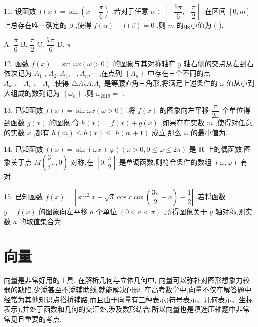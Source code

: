 11. 设函数 $f\left( x\right)  = \sin \left( {x - \dfrac{\pi }{6}}\right)$ ,若对于任意 $\alpha  \in  \left\lbrack  {-\dfrac{5\pi }{6}, - \dfrac{\pi }{2}}\right\rbrack$ ,在区间 $\left\lbrack  {0,m}\right\rbrack$ 上总存在唯一确定的 $\beta$ ,使得 $f\left( \alpha \right)  + f\left( \beta \right)  = 0$ ,则 $m$ 的最小值为 (   ).

A. $\dfrac{\pi }{6}$ B. $\dfrac{\pi }{2}$ C. $\dfrac{7\pi }{6}$ D. $\pi$

12. 函数 $f\left( x\right)  = \sin {\omega x}\left( {\omega  > 0}\right)$ 的图象与其对称轴在 $y$ 轴右侧的交点从左到右依次记为 ${A}_{1}$ , ${A}_{2},{A}_{3},\cdots ,{A}_{n},\cdots$ ,在点列 $\left\{  {A}_{n}\right\}$ 中存在三个不同的点 ${A}_{k}\text{ 、 }{A}_{i}\text{ 、 }{A}_{p}$ ,使得 $\bigtriangleup {A}_{k}{A}_{i}{A}_{p}$ 是等腰直角三角形,将满足上述条件的 $\omega$ 值从小到大组成的数列记为 $\left\{  {\omega }_{n}\right\}$ ,则 ${\omega }_{2019} =$ \blkda{}.

13. 已知函数 $f\left( x\right)  = \sin {\omega x}\left( {\omega  > 0}\right)$ ,将 $f\left( x\right)$ 的图象向左平移 $\dfrac{\pi }{2\omega }$ 个单位得到函数 $g\left( x\right)$ 的图象,令 $h\left( x\right)  = f\left( x\right)  + g\left( x\right)$ ,如果存在实数 $m$ ,使得对任意的实数 $x$ ,都有 $h\left( m\right)  \leq  h\left( x\right)  \leq$  $h\left( {m + 1}\right)$ 成立,那么 $\omega$ 的最小值为\blkda{}.

14. 已知函数 $f\left( x\right)  = \sin \left( {{\omega x} + \varphi }\right) \left( {\omega  > 0,0 \leq  \varphi  \leq  {2\pi }}\right)$ 是 $\mathbf{R}$ 上的偶函数,图象关于点 $M\left( {\dfrac{3}{4}\pi ,0}\right)$ 对称,在 $\left\lbrack  {0,\dfrac{\pi }{2}}\right\rbrack$ 是单调函数,则符合条件的数组 $\left( {\omega ,\varphi }\right)$ 有\blkda{} 对.

15. 已知函数 $f\left( x\right)  = \left| {{\sin }^{2}x - \sqrt{3}\cos x\cos \left( {\dfrac{3\pi }{2} - x}\right)  - \dfrac{1}{2}}\right|$ ,若将函数 $y = f\left( x\right)$ 的图象向左平移 $a$ 个单位 $\left( {0 < a < \pi }\right)$ ,所得图象关于 $y$ 轴对称,则实数 $a$ 的取值集合为\blkda{}.

\section*{向量}

向量是非常好用的工具, 在解析几何与立体几何中, 向量可以弥补对图形想象力较弱的缺陷,少添甚至不添辅助线,就能解决问题. 在高考数学中,向量不仅在解答题中经常为其他知识点搭桥铺路,而且由于向量有三种表示(符号表示、几何表示、坐标表示),并处于函数和几何的交汇处,涉及数形结合,所以向量也是填选压轴题中非常常见且重要的考点.

